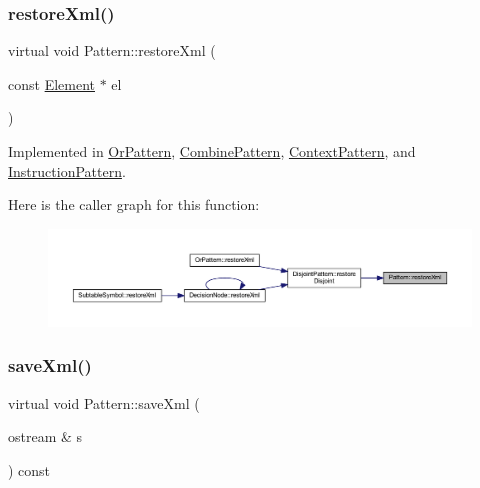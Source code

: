 \subsubsection{\texorpdfstring{restoreXml()}{restoreXml()}}
{\footnotesize\ttfamily virtual void Pattern\+::restore\+Xml (\begin{DoxyParamCaption}\item[{const \mbox{\hyperlink{class_element}{Element}} $\ast$}]{el }\end{DoxyParamCaption})\hspace{0.3cm}{\ttfamily [pure virtual]}}



Implemented in \mbox{\hyperlink{class_or_pattern_a75be51aafaaf737dc8ae34cc5907b66f}{Or\+Pattern}}, \mbox{\hyperlink{class_combine_pattern_a4d72e9c16ce072982379a9da0bf2ad78}{Combine\+Pattern}}, \mbox{\hyperlink{class_context_pattern_a0a49308ce8b3b8b66226f78911f5d0ec}{Context\+Pattern}}, and \mbox{\hyperlink{class_instruction_pattern_adeb7cb99c731f21b58f201972d923ac8}{Instruction\+Pattern}}.

Here is the caller graph for this function\+:
\nopagebreak
\begin{figure}[H]
\begin{center}
\leavevmode
\includegraphics[width=350pt]{class_pattern_aaa8fb2873854fb42d944fa8876102bb5_icgraph}
\end{center}
\end{figure}
\mbox{\label{class_pattern_a1ad6c2ad66849318427095662b718fa9}} 
\subsubsection{\texorpdfstring{saveXml()}{saveXml()}}
{\footnotesize\ttfamily virtual void Pattern\+::save\+Xml (\begin{DoxyParamCaption}\item[{ostream \&}]{s }\end{DoxyParamCaption}) const\hspace{0.3cm}{\ttfamily [pure virtual]}}



